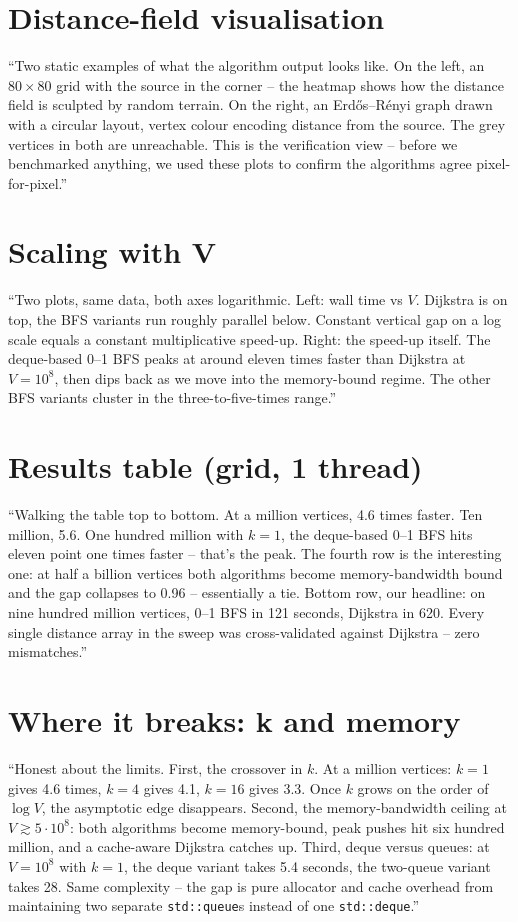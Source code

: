 \documentclass[11pt,a4paper]{article}
\begin{document}
\section{Distance-field visualisation}
``Two static examples of what the algorithm output looks like. On the
left, an $80\times80$ grid with the source in the corner -- the
heatmap shows how the distance field is sculpted by random terrain.
On the right, an Erdős--Rényi graph drawn with a circular layout,
vertex colour encoding distance from the source. The grey vertices in
both are unreachable. This is the verification view -- before we
benchmarked anything, we used these plots to confirm the algorithms
agree pixel-for-pixel.''
\hrulefill

\section{Scaling with V}
``Two plots, same data, both axes logarithmic. Left: wall time vs $V$.
Dijkstra is on top, the BFS variants run roughly parallel below.
Constant vertical gap on a log scale equals a constant multiplicative
speed-up. Right: the speed-up itself. The deque-based 0--1 BFS peaks
at around eleven times faster than Dijkstra at $V=10^8$, then dips
back as we move into the memory-bound regime. The other BFS variants
cluster in the three-to-five-times range.''
\hrulefill

\section{Results table (grid, 1 thread)}
``Walking the table top to bottom. At a million vertices, 4.6 times
faster. Ten million, 5.6. One hundred million with $k=1$, the
deque-based 0--1 BFS hits eleven point one times faster -- that's the
peak. The fourth row is the interesting one: at half a billion
vertices both algorithms become memory-bandwidth bound and the gap
collapses to 0.96 -- essentially a tie. Bottom row, our headline: on
nine hundred million vertices, 0--1 BFS in 121 seconds, Dijkstra in
620. Every single distance array in the sweep was cross-validated
against Dijkstra -- zero mismatches.''
\hrulefill

\section{Where it breaks: k and memory}
``Honest about the limits. First, the crossover in $k$. At a million
vertices: $k=1$ gives 4.6 times, $k=4$ gives 4.1, $k=16$ gives 3.3.
Once $k$ grows on the order of $\log V$, the asymptotic edge
disappears. Second, the memory-bandwidth ceiling at $V \gtrsim
5\cdot 10^8$: both algorithms become memory-bound, peak pushes hit six
hundred million, and a cache-aware Dijkstra catches up. Third, deque
versus queues: at $V=10^8$ with $k=1$, the deque variant takes 5.4
seconds, the two-queue variant takes 28. Same complexity -- the gap is
pure allocator and cache overhead from maintaining two separate
\texttt{std::queue}s instead of one \texttt{std::deque}.''
\hrulefill
\end{document}
